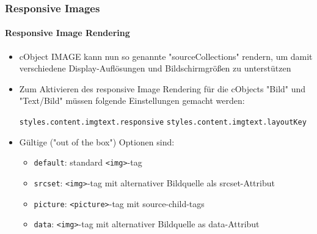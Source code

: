 \begin{frame}[fragile]
	\frametitle{Responsive Images}
	\framesubtitle{Responsive Image Rendering}

	\begin{itemize}
		\item cObject IMAGE kann nun so genannte "sourceCollections" rendern, um damit verschiedene Display-Auflösungen und Bildschirmgrößen zu unterstützen
		\item Zum Aktivieren des responsive Image Rendering für die cObjects "Bild" und "Text/Bild" müssen folgende Einstellungen gemacht werden:

			\texttt{styles.content.imgtext.responsive}\newline
			\texttt{styles.content.imgtext.layoutKey}

		\item Gültige ("out of the box") Optionen sind:

			\begin{itemize}
				\item \texttt{default}:	\tabto{2cm} standard \texttt{<img>}-tag
				\item \texttt{srcset}:	\tabto{2cm} \texttt{<img>}-tag mit alternativer Bildquelle als srcset-Attribut
				\item \texttt{picture}:	\tabto{2cm} \texttt{<picture>}-tag mit source-child-tags
				\item \texttt{data}:	\tabto{2cm} \texttt{<img>}-tag mit alternativer Bildquelle as data-Attribut
			\end{itemize}

	\end{itemize}

\end{frame}


